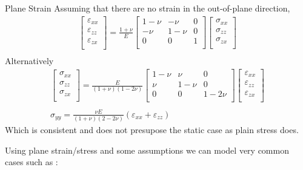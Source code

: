 \documentclass[a4paper, 11pt,article,oneside]{memoir}%
\begin{document}
\begin{eqbox2}{}{Plane Strain}
Assuming that there are no strain in the out-of-plane direction,
\begin{gather*}
\begin{bmatrix}
\varepsilon_{xx}\\
\varepsilon_{zz}\\
\varepsilon_{zx}\\
\end{bmatrix}=\frac{1+\nu}{E}
\begin{bmatrix}
1-\nu&-\nu&0\\
-\nu&1-\nu&0\\
0&0&1\\
\end{bmatrix}
\begin{bmatrix}
\sigma_{xx}\\
\sigma_{zz}\\
\sigma_{zx}\\
\end{bmatrix}\\
\end{gather*}
Alternatively
\begin{gather*}
\begin{bmatrix}
\sigma_{xx}\\
\sigma_{zz}\\
\sigma_{zx}\\
\end{bmatrix}=\frac{E}{(1+\nu)(1-2\nu)}
\begin{bmatrix}
1-\nu&\nu&0\\
\nu&1-\nu&0\\
0&0&1-2\nu\\
\end{bmatrix}
\begin{bmatrix}
\varepsilon_{xx}\\
\varepsilon_{zz}\\
\varepsilon_{zx}\\
\end{bmatrix}\\ \\
\sigma_{yy}=\frac{\nu E}{(1+\nu)(2-2\nu)}(\varepsilon_{xx}+\varepsilon_{zz})
\end{gather*}
Which is consistent and does not presupose the static case as plain stress does.
\end{eqbox2}

Using plane strain/stress and some assumptions we can model very common cases such as :\\
\end{document}
